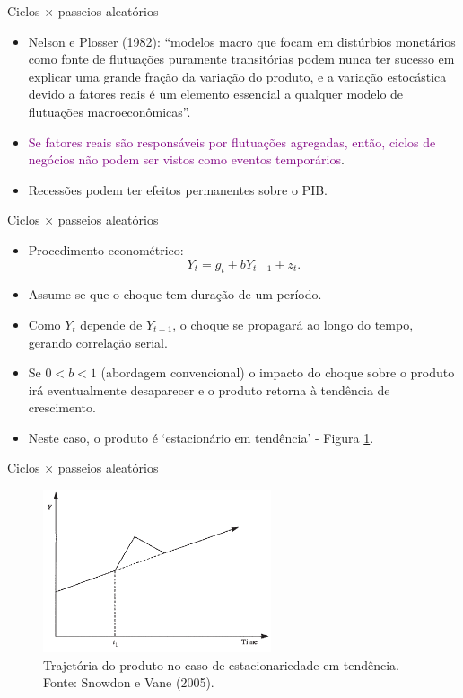 \documentclass[10pt]{beamer}
\begin{document}
\begin{frame}{Ciclos $\times$ passeios aleatórios}
    \begin{itemize}
        \item Nelson e Plosser (1982): ``modelos macro que focam em distúrbios monetários como fonte de flutuações puramente transitórias podem nunca ter sucesso em explicar uma grande fração da variação do produto, e a variação estocástica devido a fatores reais é um elemento essencial a qualquer modelo de flutuações macroeconômicas''.
        \bigskip
        \item \textcolor{purple}{Se fatores reais são responsáveis por flutuações agregadas, então, ciclos de negócios não podem ser vistos como eventos temporários}.
        \bigskip
        \item Recessões podem ter efeitos permanentes sobre o PIB.
    \end{itemize}
\end{frame}

\begin{frame}{Ciclos $\times$ passeios aleatórios}
    \begin{itemize}
        \item Procedimento econométrico:
        \[
        Y_t = g_t + bY_{t-1} + z_t.
        \]
        \bigskip
        \item Assume-se que o choque tem duração de um período.
        \bigskip
        \item Como $Y_t$ depende de $Y_{t-1}$, o choque se propagará ao longo do tempo, gerando correlação serial.
        \bigskip
        \item Se $0 < b < 1$ (abordagem convencional) o impacto do choque sobre o produto irá eventualmente desaparecer e o produto retorna à tendência de crescimento.
        \bigskip
        \item Neste caso, o produto é `estacionário em tendência' - Figura \ref{fig3}.
    \end{itemize}
\end{frame}

\begin{frame}{Ciclos $\times$ passeios aleatórios}
    \begin{figure}
        \centering
        \includegraphics[width=0.6\textwidth]{./figures/aula14_fig3.PNG}
        \caption{Trajetória do produto no caso de estacionariedade em tendência. Fonte: Snowdon e Vane (2005).}
        \label{fig3}
    \end{figure}
\end{frame}
\end{document}

